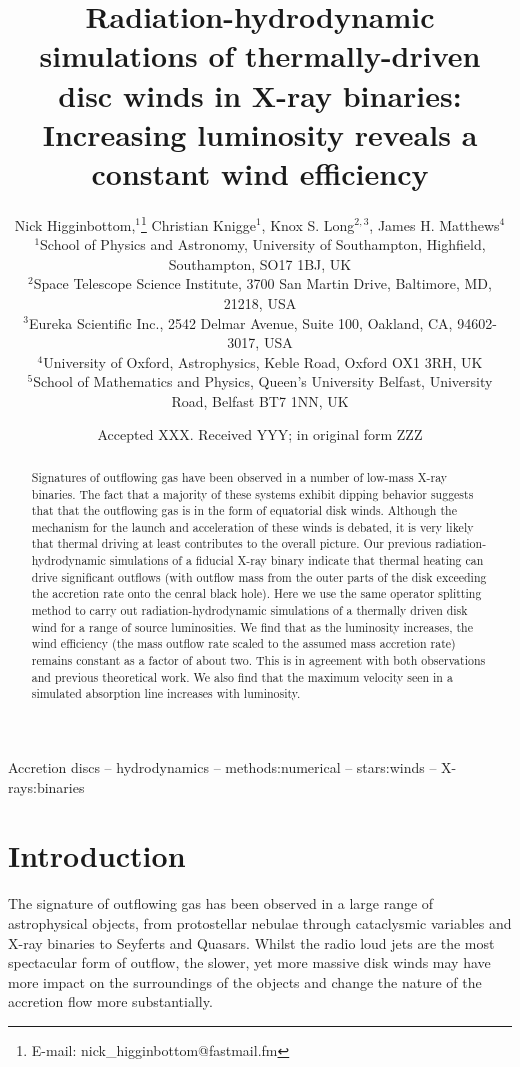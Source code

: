 \documentclass[a4paper,fleqn,usenatbib]{mnras}
\title[Increasing luminosity]{Radiation-hydrodynamic simulations of thermally-driven disc winds in X-ray binaries: Increasing
luminosity reveals a constant wind efficiency}
\author[N. Higginbottom et. al]
{Nick Higginbottom,$^{1}$\thanks{E-mail: nick\_higginbottom@fastmail.fm}
Christian Knigge$^{1}$, Knox S. Long$^{2,3}$, 
James H. Matthews$^{4}$ \newauthor{and
Edward J. Parkinson$^{1}$.}
\\
$^{1}$School of Physics and Astronomy, University of Southampton, Highfield, Southampton, SO17 1BJ, UK\\
$^{2}$Space Telescope Science Institute, 3700 San Martin Drive, Baltimore, MD, 21218, USA\\
$^{3}$Eureka Scientific Inc., 2542 Delmar Avenue, Suite 100, Oakland, CA, 94602-3017, USA\\
$^{4}$University of Oxford, Astrophysics, Keble Road, Oxford OX1 3RH, UK\\
$^{5}$School of Mathematics and Physics, Queen's University Belfast, University Road, Belfast 
BT7 1NN, UK\\
}
\date{Accepted XXX. Received YYY; in original form ZZZ}
\begin{document}
\label{firstpage}
\pagerange{\pageref{firstpage}--\pageref{lastpage}}
\maketitle

\begin{abstract}

Signatures of outflowing gas have been observed in a number of low-mass X-ray binaries. The fact that a majority of these systems exhibit dipping behavior suggests that 
that the outflowing gas is in the form 
of equatorial disk winds. Although the mechanism for the launch and acceleration of these winds is debated, it is very likely
that thermal driving at least contributes to the overall picture. Our previous radiation-hydrodynamic simulations of a fiducial X-ray binary indicate that thermal heating can drive significant outflows (with outflow mass from the outer parts of the disk exceeding the accretion rate onto the cenral black hole).
Here we use the same operator splitting method to carry out radiation-hydrodynamic simulations of a thermally driven 
disk wind for a range of source luminosities. We find that as the luminosity increases, the wind efficiency (the mass outflow
rate scaled to the assumed mass accretion rate) remains constant as a factor of about two. This is in agreement
with both observations and previous theoretical work. We also find that the maximum velocity seen in a simulated 
absorption line increases with luminosity. 



\end{abstract}

\begin{keywords}
Accretion discs -- hydrodynamics -- methods:numerical -- stars:winds -- X-rays:binaries
\end{keywords}



\section{Introduction}
The signature of outflowing gas has been observed in a large range of astrophysical objects, from protostellar
nebulae through cataclysmic variables and X-ray binaries to Seyferts and Quasars. Whilst the 
radio loud jets are the most spectacular form of outflow, the slower, yet more massive disk
winds may have more impact on the surroundings of the objects and change the nature
of the accretion flow more substantially.
 
\end{document}
